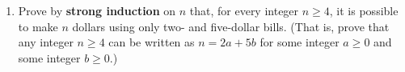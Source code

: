 \documentclass[11pt, oneside]{article}   	%
\begin{document}
\begin{enumerate}
\clearpage
\item Prove by \textbf{strong induction} on $n$ that,
for every integer $n\ge4$,
it is possible to make $n$ dollars using only two- and five-dollar bills. 
(That is, prove that any integer $n\ge4$ can be written as $n = 2a + 5b$ for some integer $a \ge 0$ and some integer $b\ge 0$.)

\end{enumerate}
\end{document}
